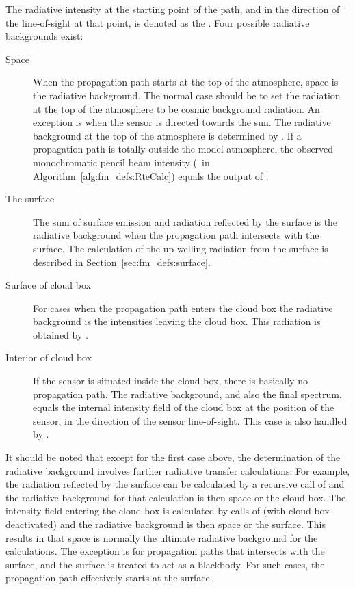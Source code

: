 The radiative intensity at the starting point of the path, and in the
direction of the line-of-sight at that point, is denoted as the
. Four possible radiative backgrounds
exist:
\begin{description}
\item[Space] When the propagation path starts at the top of the
  atmosphere, space is the radiative background. The normal case
  should be to set the radiation at the top of the atmosphere to be
  cosmic background radiation. An exception is when the sensor is
  directed towards the sun. The radiative background at the top of the
  atmosphere is determined by . If a
  propagation path is totally outside the model atmosphere, the
  observed monochromatic pencil beam intensity (\ in
  Algorithm~\ref{alg:fm_defs:RteCalc}) equals the output of
  .
\item[The surface] The sum of surface emission and radiation reflected
  by the surface is the radiative background when the propagation path
  intersects with the surface. The calculation of the up-welling
  radiation from the surface is described in
  Section~\ref{sec:fm_defs:surface}.
\item[Surface of cloud box] For cases when the propagation path enters
  the cloud box the radiative background is the intensities leaving
  the cloud box. This radiation is obtained by
  . 
\item[Interior of cloud box] If the sensor is situated inside the
  cloud box, there is basically no propagation path. The radiative
  background, and also the final spectrum, equals the internal
  intensity field of the cloud box at the position of the sensor, in
  the direction of the sensor line-of-sight. This case is also handled
  by .
\end{description}
It should be noted that except for the first case above, the
determination of the radiative background involves further radiative
transfer calculations. For example, the radiation reflected by the
surface can be calculated by a recursive call of 
and the radiative background for that calculation is then space or the
cloud box. The intensity field entering the cloud box is calculated by
calls of  (with cloud box deactivated) and the
radiative background is then space or the surface. This results in that
space is normally the ultimate radiative background for the
calculations. The exception is for propagation paths that intersects
with the surface, and the surface is treated to act as a blackbody. For
such cases, the propagation path effectively starts at the surface.


